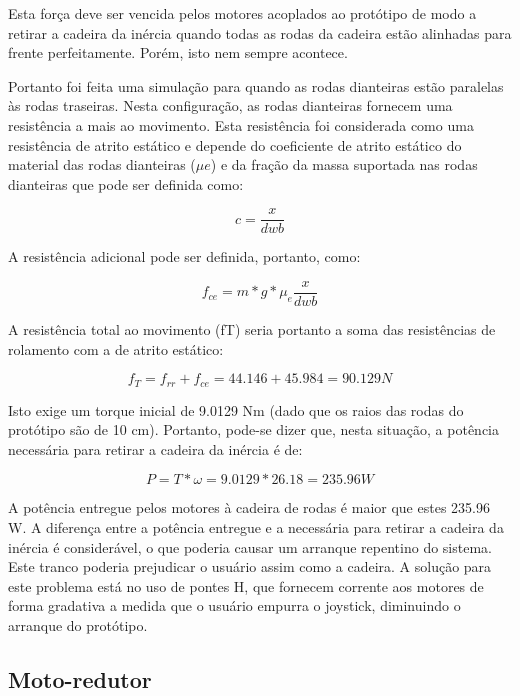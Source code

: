 Esta força deve ser vencida pelos motores acoplados ao protótipo de modo a retirar a cadeira da inércia quando todas as rodas da cadeira estão alinhadas para frente perfeitamente. Porém, isto nem sempre acontece.

Portanto foi feita uma simulação para quando as rodas dianteiras estão paralelas às rodas traseiras. Nesta configuração, as rodas dianteiras fornecem uma resistência a mais ao movimento. Esta resistência foi considerada como uma resistência de atrito estático e depende do coeficiente de atrito estático do material das rodas dianteiras ($\mu e$) e da fração da massa suportada nas rodas dianteiras que pode ser definida como:

\begin{equation}
c = \frac{x}{dwb}
\end{equation}

A resistência adicional pode ser definida, portanto, como:

\begin{equation}
f_{ce}= m*g* \mu_e \frac{x}{dwb}
\end{equation}

A resistência total ao movimento (fT) seria portanto a soma das resistências de rolamento com a de atrito estático:

\begin{equation}
f_T = f_{rr} + f_{ce} = 44.146+45.984 = 90.129 N
\end{equation}

Isto exige um torque inicial de 9.0129 Nm (dado que os raios das rodas do protótipo são de 10 cm). Portanto, pode-se dizer que, nesta situação, a potência necessária para retirar a cadeira da inércia é de:

\begin{equation}
P = T*\omega = 9.0129*26.18 = 235.96 W
\end{equation}

  A potência entregue pelos motores à cadeira de rodas é maior que estes 235.96 W. A diferença entre a potência entregue e a necessária para retirar a cadeira da inércia é considerável, o que poderia causar um arranque repentino do sistema. Este tranco poderia prejudicar o usuário assim como a cadeira. A solução para este problema está no uso de pontes H, que fornecem corrente aos motores de forma gradativa a medida que o usuário empurra o joystick, diminuindo o arranque do protótipo.

  \subsection{Moto-redutor}

